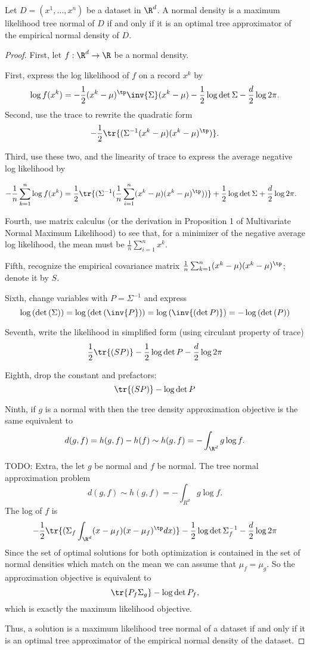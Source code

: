 \begin{proposition}
Let $D = (x^1, \dots , x^n)$ be a dataset in $\R ^d$.
A normal density is a maximum likelihood tree normal of $D$ if and only if it is an optimal tree approximator of the empirical normal density of $D$.

\begin{proof}First, let $f: \R ^d \to \R $ be a normal density.

First, express the log likelihood of $f$ on a record $x^k$ by
\[
\log f(x^k) = - \frac{1}{2} (x^k - \mu )^{\tp} \inv{\Sigma } (x^k - \mu ) - \frac{1}{2} \log \det \Sigma  - \frac{d}{2}\log 2\pi .
\]
Second, use the trace to rewrite the quadratic form
\[
-\frac{1}{2}\tr{(\Sigma ^{-1} (x^k - \mu ) (x^k - \mu )^{\tp})}.
\]

Third, use these two, and the linearity of trace to express the average negative log likelihood by

\[
\begin{aligned}
- \frac{1}{n} \sum_{k = 1}^{n} \log f(x^k) &= \frac{1}{2} \tr{(\Sigma ^{-1}(\frac{1}{n}\sum_{i = 1}^{n} (x^k - \mu )(x^k - \mu )^{\tp}))} + \frac{1}{2}\log\det\Sigma  + \frac{d}{2}\log 2\pi .
\end{aligned}
\]

Fourth, use matrix calculus (or the derivation in Proposition 1 of Multivariate Normal Maximum Likelihood) to see that, for a minimizer of the negative average log likelihood, the mean must be $\frac{1}{n} \sum_{i = 1}^{n} x^k$.

Fifth, recognize the empirical covariance matrix $\frac{1}{n}\sum_{k = 1}^{n} (x^k - \mu )(x^k - \mu )^{\tp}$; denote it by $S$.

Sixth, change variables with $P = \Sigma ^{-1}$ and express
\[
\log{(\det{(\Sigma )})} = \log{(\det{(\inv{P})})} = \log{(\inv{(\det P)})} = -\log{(\det{(P)})}
\]

Seventh, write the likelihood in simplified form (using circulant property of trace)
\[
\frac{1}{2} \tr{(SP)} - \frac{1}{2} \log \det P - \frac{d}{2}\log 2\pi
\]

Eighth, drop the constant and prefactors:
\[
\tr{(SP)} - \log \det P
\]

Ninth, if $g$ is a normal with then the tree density approximation objective is the same equivalent to
\[
d(g, f) = h(g, f) - h(f) \sim h(g, f) = - \int_{\R ^d} g\log f.
\]

TODO:
Extra, the let $g$ be normal and $f$ be normal. The tree normal approximation problem
\[
d(g, f) \sim h(g, f) = - \int_{R^d} g \log f.
\]
The log of $f$ is
\[
- \frac{1}{2} \tr{( \Sigma _f \int_{\R ^d} (x - \mu _f)(x - \mu _f)^{\tp} dx )} - \frac{1}{2} \log \det \Sigma _f^{-1} - \frac{d}{2} \log 2\pi
\]
Since the set of optimal solutions for both optimization is contained in the set of normal densities which match on the mean we can assume that $\mu _f = \mu _g$.
So the approximation objective is equivalent to
\[
\tr{P_f \Sigma _g} - \log \det P_f,
\]
which is exactly the maximum likelihood objective.

Thus, a solution is a maximum likelihood tree normal of a dataset if and only if it is an optimal tree approximator of the empirical normal density of the dataset.


\end{proof}
\end{proposition}
